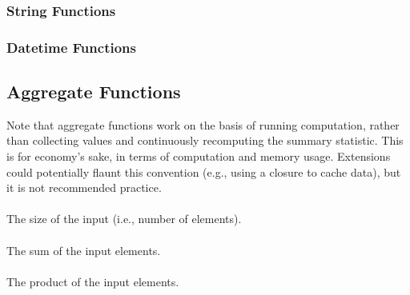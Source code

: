 \paragraph{}

\subsubsection{String Functions}


\subsubsection{Datetime Functions}


\subsection{Aggregate Functions}

Note that aggregate functions work on the basis of running computation,
rather than collecting values and continuously recomputing the summary
statistic. This is for economy's sake, in terms of computation and
memory usage. Extensions could potentially flaunt this convention (e.g.,
using a closure to cache data), but it is not recommended practice.

\paragraph{}

The size of the input (i.e., number of elements).

\paragraph{}

The sum of the input elements.

\paragraph{}

The product of the input elements.

\paragraph{}

